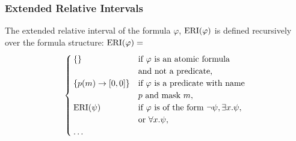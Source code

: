 \begin{frame}
    \frametitle{Extended Relative Intervals}
    \begin{definition}
        \label{def:e-rel-int}
        The extended relative interval of the formula $\varphi$, $\operatorname{ERI}(\varphi)$ is defined recursively over the formula structure:
        $\operatorname{ERI}(\varphi) =$
        \begin{equation*}
            \begin{cases}
                \{\} 
                    & \text{if } \varphi \text{ is an atomic formula} \\
                    & \text{and not a predicate,} \\ 
                \{p(m) \rightarrow [0,0]\} 
                    & \text{if } \varphi \text{ is a predicate with name } \\
                    & p \text{ and mask } m, \\
                \operatorname{ERI}(\psi) 
                    & \text{if } \varphi \text{ is of the form } \neg \psi, \exists x.\psi, \\
                    & \text{or } \forall x.\psi, \\
                \dots
            \end{cases}
        \end{equation*}
    \end{definition}
    
\end{frame}
